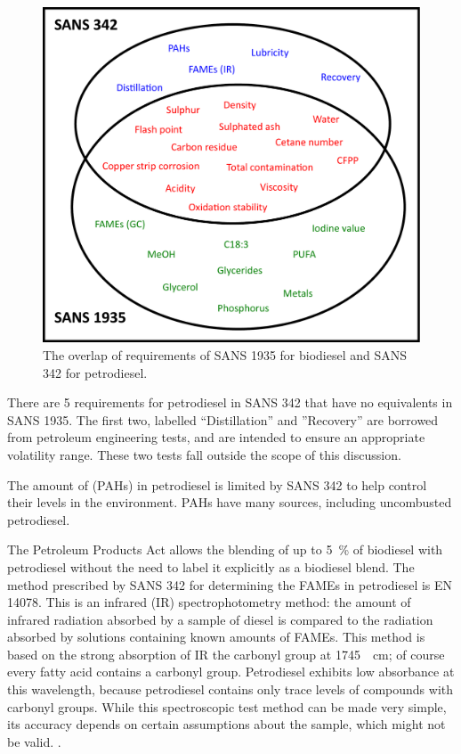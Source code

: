 \begin{figure}
\centering
\includegraphics[width=\textwidth]{Figures/Venn.pdf}
\decoRule

\caption[Overlap of requirements ]{The overlap of requirements of SANS 1935
for biodiesel and SANS 342 for petrodiesel.}

\label{fig:Venn}
\end{figure}

There are \num{5} requirements for petrodiesel in SANS 342 that have no
equivalents in SANS 1935. The first two, labelled ``Distillation'' and
''Recovery'' are borrowed from petroleum engineering tests, and are intended to
ensure an appropriate volatility range. These two tests fall outside the scope
of this discussion.

The amount of  (PAHs) in petrodiesel
is limited by SANS 342 to help control their levels in the environment. PAHs
have many sources, including uncombusted petrodiesel. 

The Petroleum Products Act allows the blending of up to \SI{5}{\percent} of
biodiesel with petrodiesel without the need to label it explicitly as a
biodiesel blend. The method prescribed by SANS 342 for determining the FAMEs in
petrodiesel is EN 14078. This is an infrared (IR) spectrophotometry method: the
amount of infrared radiation absorbed by a sample of diesel is compared to the
radiation absorbed by solutions containing known amounts of FAMEs. This method
is based on the strong absorption of IR the carbonyl group at
\SI{1745}{\per\centi\metre}; of course every fatty acid contains a carbonyl
group. Petrodiesel exhibits low absorbance at this wavelength, because
petrodiesel contains only trace levels of compounds with carbonyl groups. While
this spectroscopic test method can be made very simple, its accuracy depends on
certain assumptions about the sample, which might not be valid.
\autocite{Pinho2014}.

